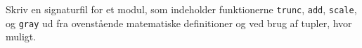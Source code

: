 \label{signature}Skriv en signaturfil for et modul, som indeholder funktionerne \lstinline{trunc}, \lstinline{add}, \lstinline{scale}, og \lstinline{gray} ud fra ovenstående matematiske definitioner og ved brug af tupler, hvor muligt.

